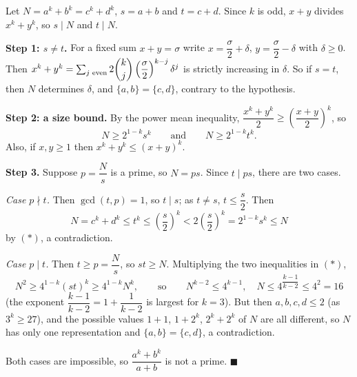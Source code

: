 Let $N=a^k+b^k=c^k+d^k$, $s=a+b$ and $t=c+d$. Since $k$ is odd, $x+y$ divides $x^k+y^k$, so $s\mid N$ and $t\mid N$.

\textbf{Step 1: $s\ne t$.} For a fixed sum $x+y=\sigma$ write $x=\dfrac{\sigma}{2}+\delta$, $y=\dfrac{\sigma}{2}-\delta$ with $\delta\ge0$. Then $x^k+y^k=\sum_{j\text{ even}}2\dbinom kj\left(\dfrac{\sigma}{2}\right)^{k-j}\delta^j$ is strictly increasing in $\delta$. So if $s=t$, then $N$ determines $\delta$, and $\{a,b\}=\{c,d\}$, contrary to the hypothesis.

\textbf{Step 2: a size bound.} By the power mean inequality, $\dfrac{x^k+y^k}{2}\ge\left(\dfrac{x+y}{2}\right)^k$, so
\[
N\ge2^{1-k}s^k\qquad\text{and}\qquad N\ge2^{1-k}t^k. \tag{$*$}
\]
Also, if $x,y\ge1$ then $x^k+y^k\le(x+y)^k$.

\textbf{Step 3.} Suppose $p=\dfrac {N}{s}$ is a prime, so $N=ps$. Since $t\mid ps$, there are two cases.

\emph{Case $p\nmid t$.} Then $\gcd(t,p)=1$, so $t\mid s$; as $t\ne s$, $t\le\dfrac {s}{2}$. Then
\[
N=c^k+d^k\le t^k\le\left(\dfrac {s}{2}\right)^k<2\left(\dfrac {s}{2}\right)^k=2^{1-k}s^k\le N
\]
by $(*)$, a contradiction.

\emph{Case $p\mid t$.} Then $t\ge p=\dfrac {N}{s}$, so $st\ge N$. Multiplying the two inequalities in $(*)$,
\[
N^2\ge4^{1-k}(st)^k\ge4^{1-k}N^k,\qquad\text{so}\qquad N^{k-2}\le4^{k-1},\quad N\le4^{\dfrac{k-1}{k-2}}\le4^2=16
\]
(the exponent $\dfrac{k-1}{k-2}=1+\dfrac{1}{k-2}$ is largest for $k=3$). But then $a,b,c,d\le2$ (as $3^k\ge27$), and the possible values $1+1$, $1+2^k$, $2^k+2^k$ of $N$ are all different, so $N$ has only one representation and $\{a,b\}=\{c,d\}$, a contradiction.

Both cases are impossible, so $\dfrac{a^k+b^k}{a+b}$ is not a prime. $\blacksquare$
